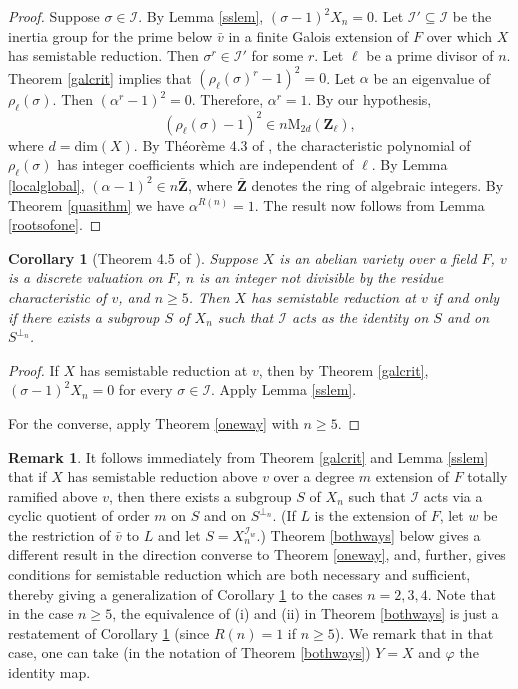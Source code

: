 \documentclass{amsart}
\def\Z{{\mathbf Z}}
\def\I{{\mathcal I}}
\def\M{\mathrm{M}}
\def\dim{\mathrm{dim}}
\newtheorem{cor}[thm]{Corollary}
\theoremstyle{definition}
\newtheorem{rem}[thm]{Remark}
\begin{document}
\begin{proof}
Suppose $\sigma \in \I$.
By Lemma \ref{sslem}, $(\sigma-1)^2 X_n = 0$.
Let $\I' \subseteq \I$ be the inertia group for the prime 
below ${\bar v}$ in a
finite Galois extension of $F$ over which $X$ has 
semistable reduction.
Then $\sigma^r \in \I'$ for some $r$.
Let $\ell$ be a prime divisor of $n$. 
Theorem \ref{galcrit} implies that
$(\rho_{\ell}(\sigma)^r-1)^2 = 0$.
Let $\alpha$ be an eigenvalue of $\rho_{\ell}(\sigma)$.
Then $(\alpha^r-1)^2 = 0$.
Therefore, $\alpha^r = 1$.
By our hypothesis, 
$$(\rho_{\ell}(\sigma)-1)^2 \in n\M_{2d}(\Z_\ell),$$
where $d = \dim(X)$.
By Th\'eor\`eme 4.3 of \cite{SGA}, 
the characteristic polynomial of $\rho_{\ell}(\sigma)$
has integer coefficients which are independent of $\ell$.
By Lemma \ref{localglobal},
$(\alpha-1)^2 \in n{\bar \Z}$, where ${\bar \Z}$ denotes
the ring of algebraic integers.
By Theorem \ref{quasithm} we have $\alpha^{R(n)} = 1$.
The result now follows from Lemma \ref{rootsofone}.
\end{proof}

\begin{cor}[Theorem 4.5 of \cite{dpp}]
\label{fromdpp}
Suppose $X$ is an abelian variety over a field $F$, $v$ is a discrete 
valuation on $F$, $n$ is an integer not 
divisible by the residue characteristic of $v$, and $n \ge 5$. 
Then $X$ has semistable reduction at $v$ if and only if
there exists a subgroup $S$ of $X_n$
such that $\I$ acts as the identity on $S$ and on $S^{\perp_n}$.
\end{cor}

\begin{proof}
If $X$ has semistable reduction at $v$, then by Theorem \ref{galcrit},
$(\sigma - 1)^2X_n = 0$ for every $\sigma \in \I$. Apply 
Lemma \ref{sslem}.

For the converse, apply Theorem \ref{oneway} with $n \ge 5$.
\end{proof}

\begin{rem}
\label{otherway}
It follows immediately from Theorem \ref{galcrit} and Lemma \ref{sslem}
that if $X$ has semistable reduction above $v$ over a degree 
$m$ extension of $F$ totally ramified above $v$,
then there exists a subgroup $S$ of $X_n$
such that $\I$ acts via a cyclic quotient of order $m$ 
on $S$ and on $S^{\perp_n}$. (If $L$ is the extension of $F$,
let $w$ be the restriction of ${\bar v}$
to $L$ and let $S = X_n^{\I_w}$.) 
Theorem \ref{bothways} below gives a different result in the
direction converse to Theorem \ref{oneway}, and, further, gives
conditions for semistable reduction which are both necessary
and sufficient, thereby giving a generalization of 
Corollary \ref{fromdpp} to the cases $n = 2, 3, 4$.
Note that in the case $n \ge 5$, the equivalence of (i)
and (ii) in Theorem \ref{bothways} is just a restatement
of Corollary \ref{fromdpp} (since $R(n) = 1$ if $n \ge 5$).
We remark that in that case, one can take
(in the notation of Theorem \ref{bothways}) $Y = X$ and 
$\varphi$ the identity map.
\end{rem}
\end{document}
